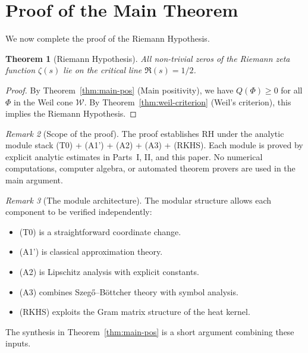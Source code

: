 \documentclass[11pt,a4paper]{article}
\newtheorem{theorem}{Theorem}[section]
\theoremstyle{definition}
\theoremstyle{remark}
\newtheorem{remark}[theorem]{Remark}
\begin{document}
\section{Proof of the Main Theorem}
\label{sec:RH}

We now complete the proof of the Riemann Hypothesis.

\begin{theorem}[Riemann Hypothesis]\label{thm:RH}
All non-trivial zeros of the Riemann zeta function $\zeta(s)$ lie on the critical line $\Re(s) = 1/2$.
\end{theorem}

\begin{proof}
By Theorem~\ref{thm:main-pos} (Main positivity), we have $Q(\Phi) \geq 0$ for all $\Phi$ in the Weil cone $\mathcal{W}$. By Theorem~\ref{thm:weil-criterion} (Weil's criterion), this implies the Riemann Hypothesis.
\end{proof}

\begin{remark}[Scope of the proof]\label{rem:scope}
The proof establishes RH under the analytic module stack (T0) + (A1') + (A2) + (A3) + (RKHS). Each module is proved by explicit analytic estimates in Parts~I, II, and this paper. No numerical computations, computer algebra, or automated theorem provers are used in the main argument.
\end{remark}

\begin{remark}[The module architecture]\label{rem:architecture}
The modular structure allows each component to be verified independently:
\begin{itemize}
\item (T0) is a straightforward coordinate change.
\item (A1') is classical approximation theory.
\item (A2) is Lipschitz analysis with explicit constants.
\item (A3) combines Szeg\H{o}--B\"ottcher theory with symbol analysis.
\item (RKHS) exploits the Gram matrix structure of the heat kernel.
\end{itemize}
The synthesis in Theorem~\ref{thm:main-pos} is a short argument combining these inputs.
\end{remark}

\end{document}
